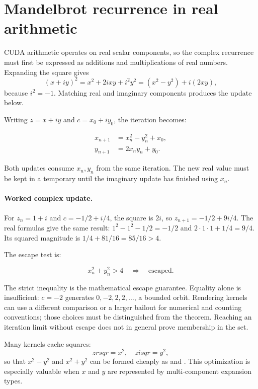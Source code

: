 \section{Mandelbrot recurrence in real arithmetic}
\label{sec:real-form}

CUDA arithmetic operates on real scalar components, so the complex recurrence must
first be expressed as additions and multiplications of real numbers. Expanding the
square gives
\[
  (x+iy)^2=x^2+2ixy+i^2y^2=(x^2-y^2)+i(2xy),
\]
because $i^2=-1$. Matching real and imaginary components produces the update below.

Writing \(z = x + i y\) and \(c = x_0 + i y_0\), the iteration becomes:

\begin{align}
x_{n+1} &= x_n^2 - y_n^2 + x_0, \\
y_{n+1} &= 2 x_n y_n + y_0.
\end{align}

Both updates consume $x_n,y_n$ from the same iteration. The new real value must be
kept in a temporary until the imaginary update has finished using $x_n$.

\paragraph{Worked complex update.}
For $z_n=1+i$ and $c=-1/2+i/4$, the square is $2i$, so
$z_{n+1}=-1/2+9i/4$. The real formulas give the same result:
$1^2-1^2-1/2=-1/2$ and $2\cdot1\cdot1+1/4=9/4$.
Its squared magnitude is $1/4+81/16=85/16>4$.

The escape test is:

\begin{equation}
x_n^2 + y_n^2 > 4 \quad\Rightarrow\quad \text{escaped.}
\end{equation}

The strict inequality is the mathematical escape guarantee. Equality alone is
insufficient: $c=-2$ generates $0,-2,2,2,\ldots$, a bounded orbit. Rendering kernels
can use a different comparison or a larger bailout for numerical and counting
conventions; those choices must be distinguished from the theorem. Reaching an
iteration limit without escape does not in general prove membership in the set.

Many kernels cache squares:
\[
zrsqr = x^2,\quad zisqr = y^2,
\]
so that \(x^2-y^2\) and \(x^2+y^2\) can be formed cheaply as 
and . This optimization is especially valuable when \(x\) and \(y\) are
represented by multi-component expansion types.
